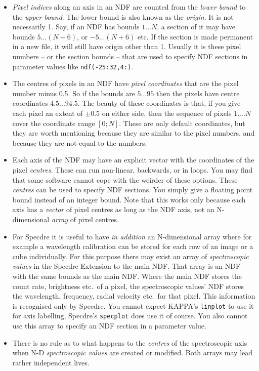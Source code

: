 \begin{itemize}
\item {\it Pixel indices} along an axis in an NDF are counted from the
   {\it lower bound} to the {\it upper bound}.  The lower bound is also
   known as the {\it origin}.  It is not necessarily 1.  Say, if an NDF
   has bounds $1 ... N$, a section of it may have bounds $5 ... (N-6)$, or
   $-5 ... (N+6)$ etc.  If the section is made permanent in a new file, it
   will still have origin other than 1.  Usually it is these pixel
   numbers -- or the section bounds -- that are used to specify NDF
   sections in parameter values like {\tt ndf(-25:32,4:)}.

\item The centres of pixels in an NDF have {\it pixel coordinates} that
   are the pixel number minus 0.5.  So if the bounds are $5 ... 95$ then
   the pixels have centre coordinates $4.5 ... 94.5$.  The beauty of
   these coordinates is that, if you give each pixel an extent of $\pm
   0.5$ on either side, then the sequence of pixels $1 .... N$ cover the
   coordinate range $[0;N]$.  These are only default coordinates, but
   they are worth mentioning because they are similar to the pixel
   numbers, and because they are not equal to the numbers.

\item Each axis of the NDF may have an explicit vector with the
   coordinates of the pixel {\it centres}.  These can run non-linear,
   backwards, or in loops.  You may find that some software cannot cope
   with the weirder of these options.  These {\it centres} can be used
   to specify NDF sections.  You simply give a floating point bound
   instead of an integer bound.  Note that this works only because each
   axis has a {\it vector} of pixel centres as long as the NDF axis, not
   an N-dimensional {\it array} of pixel centres.

\item For Specdre it is useful to have {\it in addition} an
   N-dimensional array where for example a wavelength calibration can be
   stored for each row of an image or a cube individually.  For this
   purpose there may exist an array of {\it spectroscopic values} in the
   Specdre Extension to the main NDF.  That array is an NDF with the
   same bounds as the main NDF.  Where the main NDF stores the count
   rate, brightness etc.\ of a pixel, the spectroscopic values' NDF
   stores the wavelength, frequency, radial velocity etc.\ for that
   pixel.  This information is recognised only by Specdre.  You cannot
   expect KAPPA's {\tt linplot} to use it for axis labelling, Specdre's
   {\tt specplot} does use it of course.  You also cannot use this array
   to specify an NDF section in a parameter value.

\item There is no rule as to what happens to the {\it centres} of the
   spectroscopic axis when N-D {\it spectroscopic values} are created or
   modified.  Both arrays may lead rather independent lives.
\end{itemize}



